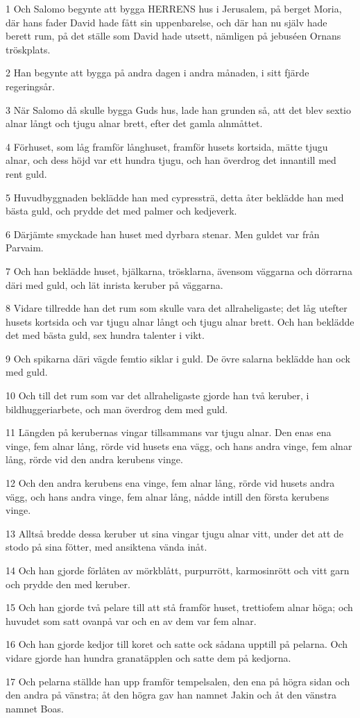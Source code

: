 \par 1 Och Salomo begynte att bygga HERRENS hus i Jerusalem, på berget Moria, där hans fader David hade fått sin uppenbarelse, och där han nu själv hade berett rum, på det ställe som David hade utsett, nämligen på jebuséen Ornans tröskplats.
\par 2 Han begynte att bygga på andra dagen i andra månaden, i sitt fjärde regeringsår.
\par 3 När Salomo då skulle bygga Guds hus, lade han grunden så, att det blev sextio alnar långt och tjugu alnar brett, efter det gamla alnmåttet.
\par 4 Förhuset, som låg framför långhuset, framför husets kortsida, mätte tjugu alnar, och dess höjd var ett hundra tjugu, och han överdrog det innantill med rent guld.
\par 5 Huvudbyggnaden beklädde han med cypressträ, detta åter beklädde han med bästa guld, och prydde det med palmer och kedjeverk.
\par 6 Därjämte smyckade han huset med dyrbara stenar. Men guldet var från Parvaim.
\par 7 Och han beklädde huset, bjälkarna, trösklarna, ävensom väggarna och dörrarna däri med guld, och lät inrista keruber på väggarna.
\par 8 Vidare tillredde han det rum som skulle vara det allraheligaste; det låg utefter husets kortsida och var tjugu alnar långt och tjugu alnar brett. Och han beklädde det med bästa guld, sex hundra talenter i vikt.
\par 9 Och spikarna däri vägde femtio siklar i guld. De övre salarna beklädde han ock med guld.
\par 10 Och till det rum som var det allraheligaste gjorde han två keruber, i bildhuggeriarbete, och man överdrog dem med guld.
\par 11 Längden på kerubernas vingar tillsammans var tjugu alnar. Den enas ena vinge, fem alnar lång, rörde vid husets ena vägg, och hans andra vinge, fem alnar lång, rörde vid den andra kerubens vinge.
\par 12 Och den andra kerubens ena vinge, fem alnar lång, rörde vid husets andra vägg, och hans andra vinge, fem alnar lång, nådde intill den första kerubens vinge.
\par 13 Alltså bredde dessa keruber ut sina vingar tjugu alnar vitt, under det att de stodo på sina fötter, med ansiktena vända inåt.
\par 14 Och han gjorde förlåten av mörkblått, purpurrött, karmosinrött och vitt garn och prydde den med keruber.
\par 15 Och han gjorde två pelare till att stå framför huset, trettiofem alnar höga; och huvudet som satt ovanpå var och en av dem var fem alnar.
\par 16 Och han gjorde kedjor till koret och satte ock sådana upptill på pelarna. Och vidare gjorde han hundra granatäpplen och satte dem på kedjorna.
\par 17 Och pelarna ställde han upp framför tempelsalen, den ena på högra sidan och den andra på vänstra; åt den högra gav han namnet Jakin och åt den vänstra namnet Boas.

